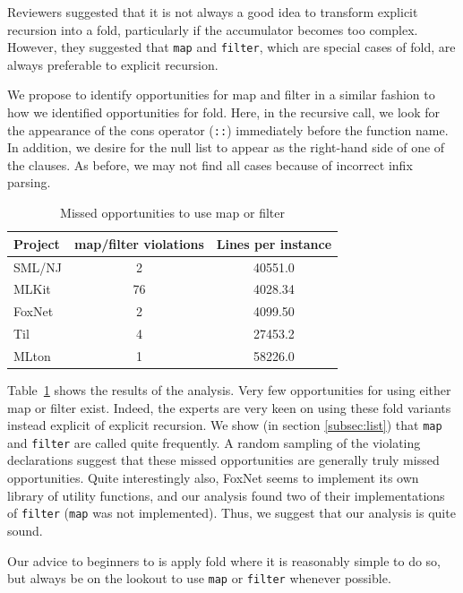 \documentclass[12pt,abstracton]{scrartcl}
\begin{document}
Reviewers suggested that it is not always a good idea to transform
explicit recursion into a fold, particularly if the accumulator becomes
too complex. However, they suggested that \texttt{map} and \texttt{filter}, which are
special cases of fold, are always preferable to explicit recursion.

We propose to identify opportunities for map and filter
in a similar fashion to how we identified opportunities for fold.
Here, in the recursive call, we look for the appearance of the cons operator (\texttt{::})
immediately before the function name. In addition, we desire for the
null list to appear as the right-hand side of one of the clauses.
As before, we may not find all cases because of incorrect infix parsing.

\begin{table}[h!]
\centering
\begin{tabular}{|l||c|c|}\hline
Project & map/filter violations & Lines per instance \\ \hline\hline
SML/NJ & 2 & 40551.0 \\
MLKit & 76 & 4028.34 \\
FoxNet & 2 & 4099.50 \\
Til & 4 & 27453.2 \\
MLton & 1 & 58226.0 \\ \hline
\end{tabular}
\caption{Missed opportunities to use map or filter}
\label{table:mapfilter}
\end{table}

Table~\ref{table:mapfilter} shows the results of the analysis.
Very few opportunities for using either map or filter exist.
Indeed, the experts are very keen on using these fold variants
instead explicit of explicit recursion.
We show (in section \ref{subsec:list})
that \texttt{map} and \texttt{filter} are called quite frequently.
A random sampling of the violating declarations suggest that
these missed opportunities are generally truly missed opportunities.
Quite interestingly also, FoxNet seems to implement its own library
of utility functions, and our analysis found two of their
implementations of \texttt{filter} (\texttt{map} was not implemented).
Thus, we suggest that our analysis is quite sound.

Our advice to beginners to is apply fold where it is reasonably
simple to do so, but always be on the lookout to use \texttt{map} or \texttt{filter}
whenever possible.
\end{document}
